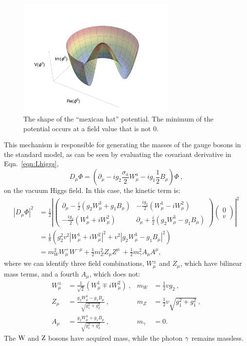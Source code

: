 \begin{figure}
\centering
\includegraphics[width=0.7\textwidth]{figs/theory/MexicanHat.pdf}
\caption{\label{fig:mexicanhat} The shape of the ``mexican hat''
  potential. The minimum of the potential occurs at
a field value that is not 0.}
\end{figure}

This mechanism is responsible for generating the masses of the gauge
bosons in the standard model, as can be seen by evaluating the 
covariant derivative in Eqn.~\ref{eqn:Lhiggs},
\begin{equation}
D_{\mu}\Phi = (\partial_{\mu} - i g_2 \frac{\sigma_a}{2}W^a_{\mu} -
ig_1\frac{1}{2}B_{\mu})\Phi ~,
\end{equation}
on the vacuum Higgs field. In this case, the kinetic term is:
\begin{align}
|D_{\mu}\Phi|^2 &= \frac{1}{2} \left|\left (\begin{matrix}\partial_{\mu}
    -\frac{i}{2}(g_2W_{\mu}^3 + g_1B_{\mu})&
    -\frac{ig_2}{2}(W_{\mu}^1-iW_{\mu}^2)\\ 
-\frac{ig_2}{2}(W_{\mu}^1+iW^2_{\mu})&\partial_{\mu}
    +\frac{i}{2}(g_2W_{\mu}^3 - g_1B_{\mu})
  \end{matrix}\right)
                                       \left(\begin{matrix}0\\v\end{matrix}\right)\right |^2 \nonumber\\
& = \frac{1}{8} \left ( g_2^2v^2|W_{\mu}^1+iW^2_{\mu}|^2 +
  v^2|g_2W^3_{\mu}-g_1B_{\mu}|^2 \right ) \nonumber\\
& = m_W^2W_{\mu}^+W^{-\mu} +
\frac{1}{2}m_Z^2Z_{\mu}Z^{\mu}~ + \frac{1}{2}m_{\gamma}^2A_{\mu}A^{\mu},
\end{align}
where we can identify three field combinations, $W_{\mu}^{\pm}$ and
$Z_{\mu}$, which have bilinear mass terms, and a fourth $A_{\mu}$,
which does not:
\begin{align}
W_{\mu}^{\pm} &= \frac{1}{\sqrt{2}}(W_{\mu}^1\mp iW^2_{\mu})~, &m_W &= \frac{1}{2}vg_2~,\\
Z_{\mu} &= \frac{g_2W_{\mu}^3 - g_1B_{\mu}}{\sqrt{g_1^2+g_2^2}}~,&m_Z &= \frac{1}{2}v\sqrt{g_1^2+g_1^2}~,\\
A_{\mu} &= \frac{g_2W_{\mu}^3 + g_1B_{\mu}}{\sqrt{g_1^2+g_2^2}}~,&m_{\gamma} &= 0.
\end{align}
The $\mathrm{W}$ and $\mathrm{Z}$ bosons have acquired mass, while the photon
$\gamma$ remains massless.

